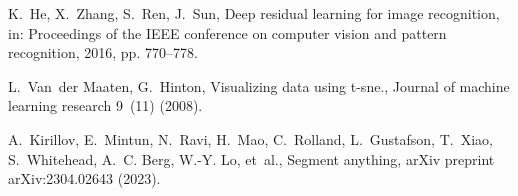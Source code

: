 \documentclass[final,5p,times,twocolumn]{elsarticle}
\begin{document}
\begin{thebibliography}{10}
K.~He, X.~Zhang, S.~Ren, J.~Sun, Deep residual learning for image recognition,
  in: Proceedings of the IEEE conference on computer vision and pattern
  recognition, 2016, pp. 770--778.

L.~Van~der Maaten, G.~Hinton, Visualizing data using t-sne., Journal of machine
  learning research 9~(11) (2008).

A.~Kirillov, E.~Mintun, N.~Ravi, H.~Mao, C.~Rolland, L.~Gustafson, T.~Xiao,
  S.~Whitehead, A.~C. Berg, W.-Y. Lo, et~al., Segment anything, arXiv preprint
  arXiv:2304.02643 (2023).

\end{thebibliography}
\end{document}
